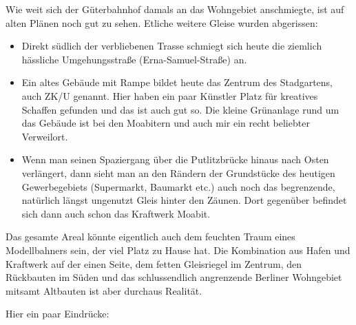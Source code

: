 Wie weit sich der G\"uterbahnhof damals an das Wohngebiet anschmiegte, ist auf alten Pl\"anen noch gut zu sehen.
Etliche weitere Gleise wurden abgerissen:
\begin{itemize}
	\item Direkt s\"udlich der verbliebenen Trasse schmiegt sich heute die ziemlich h\"assliche Umgehungsstra{\ss}e (Erna-Samuel-Stra{\ss}e) an.
	\item Ein altes Geb\"aude mit Rampe bildet heute das Zentrum des Stadgartens, auch ZK/U genannt.
	Hier haben ein paar K\"unstler Platz f\"ur kreatives Schaffen gefunden und das ist auch gut so.
	Die kleine Gr\"unanlage rund um das Geb\"aude ist bei den Moabitern und auch mir ein recht beliebter Verweilort.
	\item Wenn man seinen Spaziergang \"uber die Putlitzbr\"ucke hinaus nach Osten verl\"angert, dann sieht man an den R\"andern der Grundst\"ucke des heutigen Gewerbegebiets (Supermarkt, Baumarkt etc.) auch noch das begrenzende, nat\"urlich l\"angst ungenutzt Gleis hinter den Z\"aunen.
	Dort gegen\"uber befindet sich dann auch schon das Kraftwerk Moabit.
\end{itemize}

Das gesamte Areal k\"onnte eigentlich auch dem feuchten Traum eines Modellbahners sein, der viel Platz zu Hause hat.
Die Kombination aus Hafen und Kraftwerk auf der einen Seite, dem fetten Gleisriegel im Zentrum, den R\"uckbauten im S\"uden und das schlussendlich angrenzende Berliner Wohngebiet mitsamt Altbauten ist aber durchaus Realit\"at.

Hier ein paar Eindr\"ucke:

